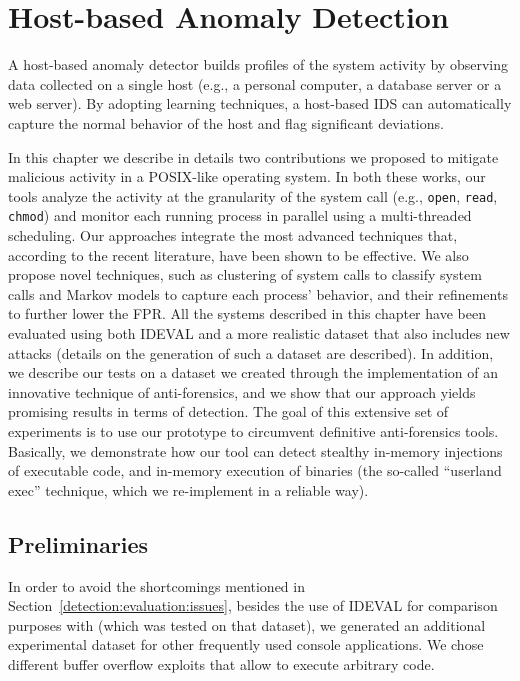 \chapter{Host-based Anomaly Detection}
\label{host}
A host-based anomaly detector builds profiles of the system activity
by observing data collected on a single host (e.g., a personal
computer, a database server or a web server). By adopting learning
techniques, a host-based \ac{IDS} can automatically capture the normal
behavior of the host and flag significant deviations.

In this chapter we describe in details two contributions we proposed
to mitigate malicious activity in a POSIX-like operating system. In
both these works, our tools analyze the activity at the granularity of
the system call (e.g., \texttt{open}, \texttt{read}, \texttt{chmod})
and monitor each running process in parallel using a multi-threaded
scheduling. Our approaches integrate the most advanced techniques
that, according to the recent literature, have been shown to be
effective. We also propose novel techniques, such as clustering of
system calls to classify system calls and Markov models to capture
each process' behavior, and their refinements to further lower the
\ac{FPR}. All the systems described in this chapter have been
evaluated using both \ac{IDEVAL} and a more realistic dataset that
also includes new attacks (details on the generation of such a dataset
are described). In addition, we describe our tests on a dataset we
created through the implementation of an innovative technique of
anti-forensics, and we show that our approach yields promising results
in terms of detection. The goal of this extensive set of experiments
is to use our prototype to circumvent definitive anti-forensics
tools. Basically, we demonstrate how our tool can detect stealthy
in-memory injections of executable code, and in-memory execution of
binaries (the so-called ``userland exec'' technique, which we
re-implement in a reliable way).

\section{Preliminaries}
\label{host:experimental-setup}
In order to avoid the shortcomings mentioned in
Section~\ref{detection:evaluation:issues}, besides the use of
\ac{IDEVAL} for comparison purposes with \SyscallAnomaly
(which was tested on that dataset), we generated an additional
experimental dataset for other frequently used console
applications. We chose different buffer overflow exploits that allow
to execute arbitrary code.

